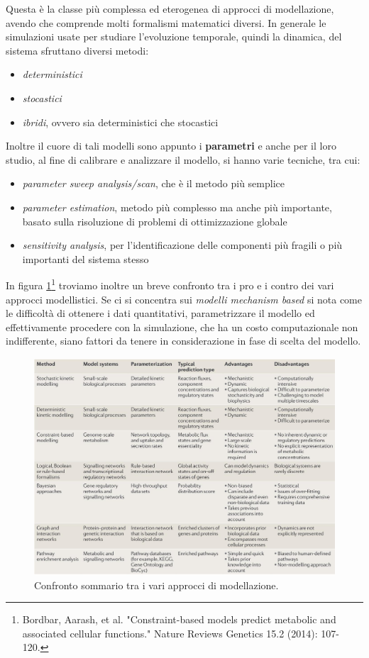 \documentclass[a4paper,12pt, oneside]{book}
\begin{document}
Questa è la classe più complessa ed eterogenea di approcci di modellazione,
avendo che comprende molti formalismi matematici diversi. In generale le
simulazioni usate per studiare l'evoluzione temporale, quindi la dinamica, del
sistema sfruttano diversi metodi:
\begin{itemize}
  \item \textit{deterministici}
  \item \textit{stocastici}
  \item \textit{ibridi}, ovvero sia deterministici che stocastici
\end{itemize}
Inoltre il cuore di tali modelli sono appunto i \textbf{parametri} e anche per
il loro studio, al fine di calibrare e analizzare il modello, si hanno varie
tecniche, tra cui:
\begin{itemize}
  \item \textit{parameter sweep analysis/scan}, che è il metodo più semplice
  \item \textit{parameter estimation}, metodo più complesso ma anche più
  importante, basato sulla risoluzione di problemi di ottimizzazione globale
  \item \textit{sensitivity analysis}, per l'identificazione delle componenti
  più fragili o più importanti del sistema stesso
\end{itemize}
In figura \ref{fig:confr}\footnote{Bordbar, Aarash, et al. "Constraint-based
  models predict metabolic and associated cellular functions." Nature Reviews
  Genetics 15.2 (2014): 107-120.} troviamo inoltre un breve confronto tra i 
pro e i contro dei vari approcci modellistici. Se ci si concentra sui
\textit{modelli mechanism based} si nota come le difficoltà di ottenere i dati
quantitativi, parametrizzare il modello ed effettivamente procedere con la
simulazione, che ha un costo computazionale non indifferente, siano fattori da
tenere in considerazione in fase di scelta del modello.
\begin{figure}
  \centering
  \includegraphics[scale = 0.25]{img/confr.jpg}
  \caption{Confronto sommario tra i vari approcci di modellazione.}  
  \label{fig:confr}
\end{figure}
\end{document}
